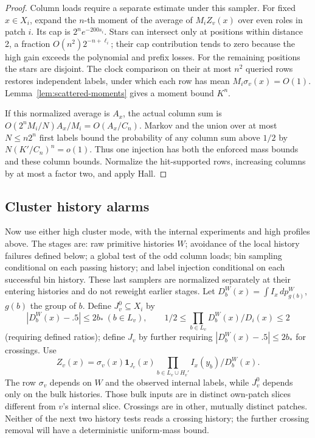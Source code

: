 \begin{proof}
Column loads require a separate estimate under this sampler. For fixed \(x\in X_i\), expand the \(n\)-th moment of the average of \(M_iZ_v(x)\) over even roles in patch \(i\). Its cap is \(2^ne^{-200s_i}\). Stars can intersect only at positions within distance 2, a fraction \(O(n^2)2^{-n+\ell_i}\); their cap contribution tends to zero because the high gain exceeds the polynomial and prefix losses. For the remaining positions the stars are disjoint. The clock comparison on their at most \(n^2\) queried rows restores independent labels, under which each row has mean \(M_i\sigma_v(x)=O(1)\). Lemma~\ref{lem:scattered-moments} gives a moment bound \(K^n\).

If this normalized average is \(A_x\), the actual column sum is
\(O(2^nM_i/N)A_x/M_i=O(A_x/C_n)\).
Markov and the union over at most \(N\le n2^n\) first labels bound the probability of any column sum above \(1/2\) by \(N(K'/C_n)^n=o(1)\). Thus one injection has both the enforced mass bounds and these column bounds. Normalize the hit-supported rows, increasing columns by at most a factor two, and apply Hall.
\end{proof}

\subsection{Cluster history alarms}
\label{sec:cluster-history-alarms}

Now use either high cluster mode, with the internal experiments and high profiles above. The stages are: raw primitive histories \(W\); avoidance of the local history failures defined below; a global test of the odd column loads; bin sampling conditional on each passing history; and label injection conditional on each successful bin history. These last samplers are normalized separately at their entering histories and do not reweight earlier stages. Let \(D_b^W(x)=\int I_x\,dp_{g(b)}^W\), \(g(b)\) the group of \(b\). Define \(J_v^0\subseteq X_i\) by
\[
 |D_b^W(x)-.5|\le2b_*\ (b\in L_v),\qquad
 1/2\le \prod_{b\in L_v}D_b^W(x)/D_i(x)\le2
\]
(requiring defined ratios); define \(J_v\) by further requiring \(|D_b^W(x)-.5|\le2b_*\) for crossings. Use
\begin{equation}
 Z_v(x)=\sigma_v(x)\mathbf1_{J_v}(x)
       \prod_{b\in L_v\cup H_v'} I_x(y_b)/D_b^W(x).             \label{eq:source-18}
\end{equation}
The row \(\sigma_v\) depends on \(W\) and the observed internal labels, while \(J_v^0\) depends only on the bulk histories. Those bulk inputs are in distinct own-patch slices different from \(v\)'s internal slice. Crossings are in other, mutually distinct patches. Neither of the next two history tests reads a crossing history; the further crossing removal will have a deterministic uniform-mass bound.

